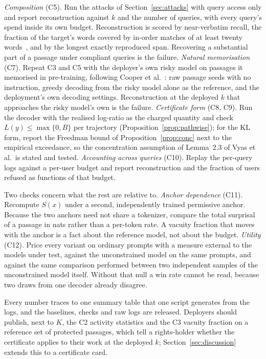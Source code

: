 \emph{Composition} (C5). Run the attacks of Section~\ref{sec:attacks} with query access only and report reconstruction against $k$ and the number of queries, with every query's spend inside its own budget. Reconstruction is scored by near-verbatim recall, the fraction of the target's words covered by in-order matches of at least twenty words~\cite{ahmed2026extracting}, and by the longest exactly reproduced span. Recovering a substantial part of a passage under compliant queries is the failure. \emph{Natural memorisation} (C7). Repeat C3 and C5 with the deployer's own risky model on passages it memorised in pre-training, following Cooper et al.~\cite{cooper2025extracting}: raw passage seeds with no instruction, greedy decoding from the risky model alone as the reference, and the deployment's own decoding settings. Reconstruction at the deployed $k$ that approaches the risky model's own is the failure. \emph{Certificate form} (C8, C9). Run the decoder with the realised log-ratio as the charged quantity and check $L(y) \le \max\{0,B\}$ per trajectory (Proposition~\ref{prop:pathwise}); for the KL form, report the Freedman bound of Proposition~\ref{prop:conc} next to the empirical exceedance, so the concentration assumption of Lemma~2.3 of Vyas et al.\ is stated and tested. \emph{Accounting across queries} (C10). Replay the per-query logs against a per-user budget and report reconstruction and the fraction of users refused as functions of that budget.

Two checks concern what the rest are relative to. \emph{Anchor dependence} (C11). Recompute $S(x)$ under a second, independently trained permissive anchor. Because the two anchors need not share a tokenizer, compare the total surprisal of a passage in nats rather than a per-token rate. A vacuity fraction that moves with the anchor is a fact about the reference model, not about the budget. \emph{Utility} (C12). Price every variant on ordinary prompts with a measure external to the models under test, against the unconstrained model on the same prompts, and against the same comparison performed between two independent samples of the unconstrained model itself. Without that null a win rate cannot be read, because two draws from one decoder already disagree.

Every number traces to one summary table that one script generates from the logs, and the baselines, checks and raw logs are released. Deployers should publish, next to $K$, the C2 activity statistics and the C3 vacuity fraction on a reference set of protected passages, which tell a rights-holder whether the certificate applies to their work at the deployed $k$; Section~\ref{sec:discussion} extends this to a certificate card.
